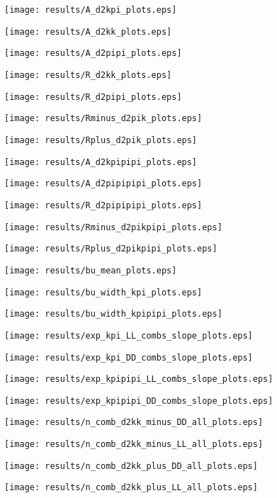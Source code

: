 \documentclass[11pt,a4paper]{article}
\begin{document}
\texttt{[image: results/A\_d2kpi\_plots.eps]}

\texttt{[image: results/A\_d2kk\_plots.eps]}

\texttt{[image: results/A\_d2pipi\_plots.eps]}

\texttt{[image: results/R\_d2kk\_plots.eps]}

\texttt{[image: results/R\_d2pipi\_plots.eps]}

\texttt{[image: results/Rminus\_d2pik\_plots.eps]}

\texttt{[image: results/Rplus\_d2pik\_plots.eps]}

\texttt{[image: results/A\_d2kpipipi\_plots.eps]}

\texttt{[image: results/A\_d2pipipipi\_plots.eps]}

\texttt{[image: results/R\_d2pipipipi\_plots.eps]}

\texttt{[image: results/Rminus\_d2pikpipi\_plots.eps]}

\texttt{[image: results/Rplus\_d2pikpipi\_plots.eps]}

\texttt{[image: results/bu\_mean\_plots.eps]}

\texttt{[image: results/bu\_width\_kpi\_plots.eps]}

\texttt{[image: results/bu\_width\_kpipipi\_plots.eps]}

\texttt{[image: results/exp\_kpi\_LL\_combs\_slope\_plots.eps]}

\texttt{[image: results/exp\_kpi\_DD\_combs\_slope\_plots.eps]}

\texttt{[image: results/exp\_kpipipi\_LL\_combs\_slope\_plots.eps]}

\texttt{[image: results/exp\_kpipipi\_DD\_combs\_slope\_plots.eps]}

\iffalse
\texttt{[image: results/n\_comb\_d2kk\_minus\_DD\_all\_plots.eps]}

\texttt{[image: results/n\_comb\_d2kk\_minus\_LL\_all\_plots.eps]}

\texttt{[image: results/n\_comb\_d2kk\_plus\_DD\_all\_plots.eps]}

\texttt{[image: results/n\_comb\_d2kk\_plus\_LL\_all\_plots.eps]}
\end{document}
